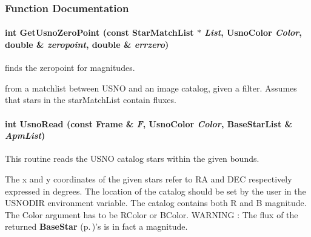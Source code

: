 \subsubsection{Function Documentation}
\paragraph{\setlength{\rightskip}{0pt plus 5cm}int Get\-Usno\-Zero\-Point (const Star\-Match\-List $\ast$ {\em List}, Usno\-Color {\em Color}, double \& {\em zeropoint}, double \& {\em errzero})}\hfill\label{usnoutils_h_a7}


finds the zeropoint for magnitudes.

from a matchlist between USNO and an image catalog, given a filter.  Assumes that stars in the star\-Match\-List contain fluxes. 
\paragraph{\setlength{\rightskip}{0pt plus 5cm}int Usno\-Read (const {\bf Frame} \& {\em F}, Usno\-Color {\em Color}, Base\-Star\-List \& {\em Apm\-List})}\hfill\label{usnoutils_h_a2}


This routine reads the USNO catalog stars within the given bounds.

The x and y coordinates of the given stars refer to RA and DEC respectively expressed in degrees. The location of the catalog should be set by the user in the USNODIR environment variable. The catalog contains both R and B magnitude. The Color argument has to be RColor or BColor.  WARNING : The flux of the returned {\bf Base\-Star} {\rm (p.\,\pageref{class_basestar})}'s is in fact a magnitude. 